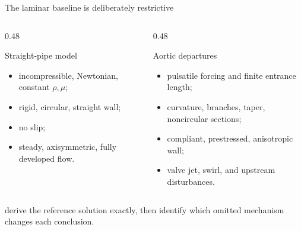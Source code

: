 \documentclass[aspectratio=169,11pt]{beamer}
\begin{document}
\begin{frame}{The laminar baseline is deliberately restrictive}
\begin{columns}[T,onlytextwidth]
\begin{column}{0.48\textwidth}
\begin{block}{Straight-pipe model}
\begin{itemize}\itemsep3pt
  \item incompressible, Newtonian, constant $\rho,\mu$;
  \item rigid, circular, straight wall;
  \item no slip;
  \item steady, axisymmetric, fully developed flow.
\end{itemize}
\end{block}
\end{column}
\begin{column}{0.48\textwidth}
\begin{alertblock}{Aortic departures}
\begin{itemize}\itemsep3pt
  \item pulsatile forcing and finite entrance length;
  \item curvature, branches, taper, noncircular sections;
  \item compliant, prestressed, anisotropic wall;
  \item valve jet, swirl, and upstream disturbances.
\end{itemize}
\end{alertblock}
\end{column}
\end{columns}

\vspace{0.5em}
 derive the reference solution exactly, then identify which omitted mechanism changes each conclusion.
\end{frame}
\end{document}
